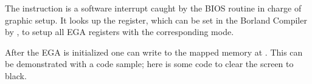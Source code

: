 \documentclass[book.tex]{subfiles}
\begin{document}
  \par
  The  instruction is a software interrupt caught by the BIOS routine in charge of graphic setup. It looks up the  register, which can be set in the Borland Compiler by , to setup all EGA registers with the corresponding mode.\\
  \par After the EGA is initialized one can write to the mapped memory at . This can be demonstrated with a code sample; here is some code to clear the screen to black.\\
  
  \begin{minipage}{\textwidth}
  
  \end{minipage}
  \label{clearvga}
  \par
  
\end{document}
